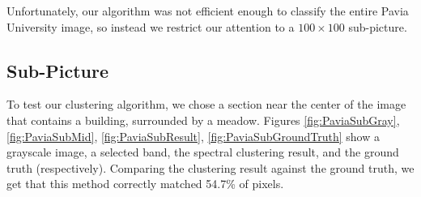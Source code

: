 \documentclass[12pt]{article}
\begin{document}
Unfortunately, our algorithm was not efficient enough to classify the entire Pavia University image, so instead we restrict our attention to a $100\times 100$ sub-picture.

\subsection{Sub-Picture}

To test our clustering algorithm, we chose a section near the center of the image that contains a building, surrounded by a meadow. Figures \ref{fig:PaviaSubGray}, \ref{fig:PaviaSubMid}, \ref{fig:PaviaSubResult}, \ref{fig:PaviaSubGroundTruth} show a grayscale image, a selected band, the spectral clustering result, and the ground truth (respectively). Comparing the clustering result against the ground truth, we get that this method correctly matched 54.7\% of pixels.
\end{document}
